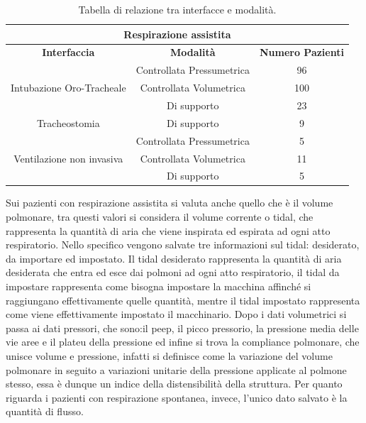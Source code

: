 \begin{table}[h!]
	\centering
	\begin{tabular}{ |c| c|c|} 
		\hline
		\multicolumn{3}{|c|}{Respirazione assistita} \\
		\hline
		\textbf{Interfaccia} & \textbf{Modalità} & \textbf{Numero Pazienti} \\
		\hline
		\hline
		\multirow[t]{3}{*}{Intubazione Oro-Tracheale}& Controllata Pressumetrica & 96 \\  \cline{2-3}
		& Controllata Volumetrica & 100 \\  \cline{2-3}
		& Di supporto  & 23 \\  \cline{2-3}
		\hline
		\hline
		Tracheostomia & Di supporto & 9 \\
		\hline 
		\hline
		\multirow[t]{3}{*}{Ventilazione non invasiva} & 
		Controllata Pressumetrica & 5 \\  \cline{2-3}
		& Controllata Volumetrica & 11 \\  \cline{2-3}
		& Di supporto  & 5 \\  \cline{2-3}
		\hline 
	\end{tabular}
	\caption{Tabella di relazione tra interfacce e modalità.}
	\label{table:intermodalita}
\end{table}

Sui pazienti con respirazione assistita si valuta anche quello che è il volume polmonare, tra questi valori si considera il volume corrente o tidal, che rappresenta la quantità di aria che viene inspirata ed espirata ad ogni atto respiratorio. Nello specifico vengono salvate tre informazioni sul tidal:  desiderato, da importare ed impostato.
Il tidal desiderato rappresenta la quantità di aria desiderata che entra ed esce dai polmoni ad ogni atto respiratorio, il tidal da impostare rappresenta come bisogna impostare la macchina affinché si raggiungano effettivamente quelle quantità, mentre il tidal impostato rappresenta come viene effettivamente impostato il macchinario.
Dopo i dati volumetrici si passa ai dati pressori, che sono:il  peep, il picco pressorio, la pressione media delle vie aree e il plateu della pressione ed infine si trova la compliance polmonare, che unisce volume e pressione, infatti si definisce come la variazione del volume polmonare in seguito a variazioni unitarie della pressione applicate al polmone stesso, essa è dunque un indice della distensibilità della struttura.
Per quanto riguarda i pazienti con respirazione spontanea, invece, l'unico dato salvato è la quantità di flusso.


